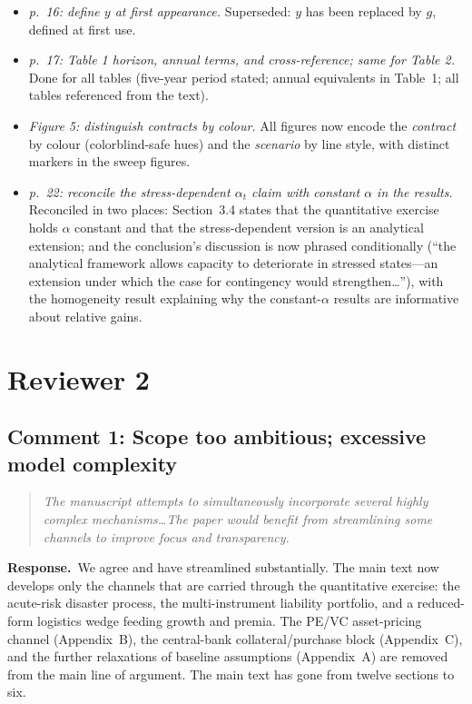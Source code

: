 \documentclass[11pt]{article}
\newcounter{comment}
\newenvironment{revcomment}%
{\refstepcounter{comment}\par\medskip\noindent\begin{quote}\itshape\color{black!70}}%
{\end{quote}\medskip}
\newcommand{\response}{\par\noindent\textbf{Response.}\ }
\begin{document}
\begin{itemize}
\item \emph{p.~16: define $y$ at first appearance.} Superseded: $y$ has been replaced by $g$, defined at first use.
\item \emph{p.~17: Table 1 horizon, annual terms, and cross-reference; same for Table 2.} Done for all tables (five-year period stated; annual equivalents in Table~1; all tables referenced from the text).
\item \emph{Figure 5: distinguish contracts by colour.} All figures now encode the \emph{contract} by colour (colorblind-safe hues) and the \emph{scenario} by line style, with distinct markers in the sweep figures.
\item \emph{p.~22: reconcile the stress-dependent $\alpha_t$ claim with constant $\alpha$ in the results.} Reconciled in two places: Section~3.4 states that the quantitative exercise holds $\alpha$ constant and that the stress-dependent version is an analytical extension; and the conclusion's discussion is now phrased conditionally (``the analytical framework allows capacity to deteriorate in stressed states---an extension under which the case for contingency would strengthen\ldots''), with the homogeneity result explaining why the constant-$\alpha$ results are informative about relative gains.
\end{itemize}

\section*{Reviewer 2}

\subsection*{Comment 1: Scope too ambitious; excessive model complexity}

\begin{revcomment}
The manuscript attempts to simultaneously incorporate several highly complex mechanisms\ldots The paper would benefit from streamlining some channels to improve focus and transparency.
\end{revcomment}

\response We agree and have streamlined substantially. The main text now develops only the channels that are carried through the quantitative exercise: the acute-risk disaster process, the multi-instrument liability portfolio, and a reduced-form logistics wedge feeding growth and premia. The PE/VC asset-pricing channel (Appendix~B), the central-bank collateral/purchase block (Appendix~C), and the further relaxations of baseline assumptions (Appendix~A) are removed from the main line of argument. The main text has gone from twelve sections to six.
\end{document}
